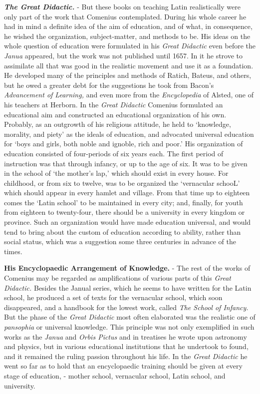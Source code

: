 \documentclass[]{book}
\begin{document}
\textbf{\emph{The Great Didactic.}} - But these books on teaching Latin realistically were only part of the work that Comenius contemplated. During his whole career he had in mind a definite idea of the aim of education, and of what, in consequence, he wished the organization, subject-matter, and methods to be. His ideas on the whole question of education were formulated in his \emph{Great Didactic} even before the \emph{Janua} appeared, but the work was not published until 1657. In it he strove to assimilate all that was good in the realistic movement and use it as a foundation. He developed many of the principles and methods of Ratich, Bateus, and others, but he owed a greater debt for the suggestions he took from Bacon's \emph{Advancement of Learning,} and even more from the \emph{Encyclopedia} of Alsted, one of his teachers at Herborn. In the \emph{Great Didactic} Comenius formulated an educational aim and constructed an educational organization of his own. Probably, as an outgrowth of his religious attitude, he held to `knowledge, morality, and piety' as the ideals of education, and advocated universal education for `boys and girls, both noble and ignoble, rich and poor.' His organization of education consisted of four-periods of six years each. The first period of instruction was that through infancy, or up to the age of six. It was to be given in the school of `the mother's lap,' which should exist in every house. For childhood, or from six to twelve, was to be organized the `vernacular schooL' which should appear in every hamlet and village. From that time up to eighteen comes the `Latin school' to be maintained in every city; and, finally, for youth from eighteen to twenty-four, there should be a university in every kingdom or province. Such an organization would have made education universal, and would tend to bring about the custom of education according to ability, rather than social status, which was a suggestion some three centuries in advance of the times.

\textbf{His Encyclopaedic Arrangement of Knowledge.} - The rest of the works of Comenius may be regarded as amplifications of various parts of this \emph{Great Didactic.} Besides the Janual series, which he seems to have written for the Latin school, he produced a set of texts for the vernacular school, which soon disappeared, and a handbook for the lowest work, called \emph{The School of Infancy.} But the phase of the \emph{Great Didactic} most often elaborated was the realistic one of \emph{pansophia} or universal knowledge. This principle was not only exemplified in such works as the \emph{Janua} and \emph{Orbis Pictus} and in treatises he wrote upon astronomy and physics, but in various educational institutions that he undertook to found, and it remained the ruling passion throughout his life. In the \emph{Great Didactic} he went so far as to hold that an encyclopaedic training should be given at every stage of education, - mother school, vernacular school, Latin school, and university.
\end{document}
